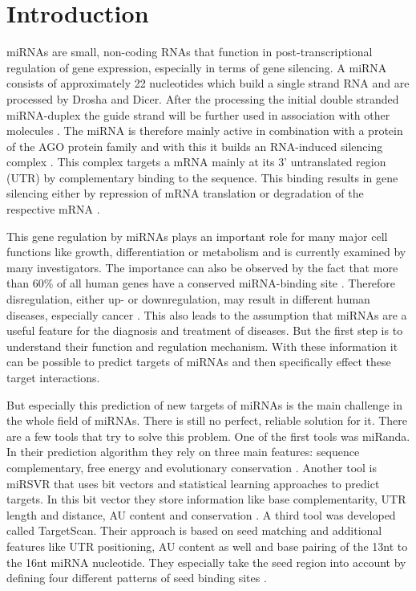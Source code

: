 \documentclass[12pt]{article}
\begin{document}
\tableofcontents

\newpage 
{}






 
\section{Introduction}

miRNAs are small, non-coding RNAs that function in post-transcriptional regulation of gene expression, especially in terms of gene silencing. A miRNA consists of approximately 22 nucleotides which build a single strand RNA and are processed by Drosha and Dicer. After the processing the initial double stranded miRNA-duplex the guide strand will be further used in association with other molecules \cite{Grunz}. The miRNA is therefore mainly active in combination with a protein of the AGO protein family and with this it builds an RNA-induced silencing complex \cite{Ha}. This complex targets a mRNA mainly at its 3' untranslated region (UTR) by complementary binding to the sequence. This binding results in gene silencing either by repression of mRNA translation or degradation of the respective mRNA \cite{Enright}. 
  
This gene regulation by miRNAs plays an important role for many major cell functions like growth, differentiation or metabolism \cite{Ardekani} and is currently examined by many investigators. The importance can also be observed by the fact that more than 60\% of all human genes have a conserved miRNA-binding site \cite{Ha}. Therefore disregulation, either up- or downregulation, may result in different human diseases, especially cancer \cite{Ardekani}. This also leads to the assumption that miRNAs are a useful feature for the diagnosis and treatment of diseases. But the first step is to understand their function and regulation mechanism. With these information it can be possible to predict targets of miRNAs and then specifically effect these target interactions.  

But especially this prediction of new targets of miRNAs is the main challenge in the whole field of miRNAs. There is still no perfect, reliable solution for it. There are a few tools that try to solve this problem. One of the first tools was miRanda. In their prediction algorithm they rely on three main features: sequence complementary, free energy and evolutionary conservation \cite{Enright}. Another tool is miRSVR that uses bit vectors and statistical learning approaches to predict targets. In this bit vector they store information like base complementarity, UTR length and distance, AU content and conservation \cite{Betel}. A third tool was developed called TargetScan. Their approach is based on seed matching and additional features like UTR positioning, AU content as well and base pairing of the 13nt to the 16nt miRNA nucleotide. They especially take the seed region into account by defining four different patterns of seed binding sites \cite{Lewis}.
\end{document}
